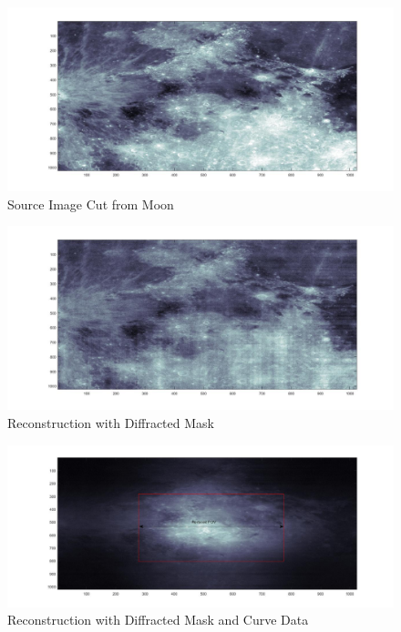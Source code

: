 \begin{figure}[]
\centering
\includegraphics[scale=0.25]{pics/OriginalImage.jpg}
\caption{Source Image Cut from Moon}
\label{fig:Orig}
\end{figure}

\begin{figure}[]
\centering
\includegraphics[scale=0.25]{pics/OriginalImageDiffRec.jpg}
\caption{Reconstruction with Diffracted Mask}
\label{fig:Rec_Diff}
\end{figure}

\begin{figure}[]
\centering
\includegraphics[scale=0.25]{pics/ImageRecWithAcc.jpg}
\caption{Reconstruction with Diffracted Mask and Curve Data}
\label{fig:Rec_Acc}
\end{figure}

